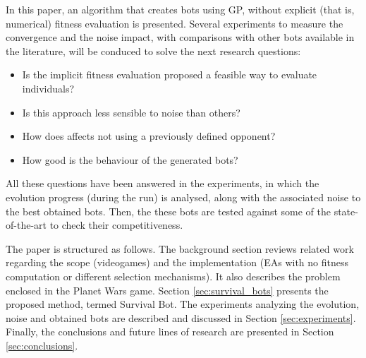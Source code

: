 \documentclass[conference]{IEEEtran}
\begin{document}


In this paper, an algorithm that creates bots using GP, without explicit (that is, numerical) fitness evaluation is presented. Several experiments to measure the convergence and the noise impact, with comparisons with other bots available in the literature, will be conduced to solve the next research questions:
\begin{itemize}
\item Is the implicit fitness evaluation proposed a feasible way to evaluate individuals?
\item Is this approach less sensible to noise than others?
\item How does affects not using a previously defined opponent?
\item How good is the behaviour of the generated bots?
\end{itemize}

All these questions have been answered in the experiments, in which the evolution progress (during the run) is analysed, along with the associated noise to the best obtained bots. Then, the these bots are tested against some of the state-of-the-art to check their competitiveness.

The paper is structured as follows. The background section reviews related work regarding the scope (videogames) and the implementation (EAs with no fitness computation or different selection mechanisms). It also describes the problem enclosed in the Planet Wars game.
Section \ref{sec:survival_bots} presents the proposed method, termed {Survival Bot}.
The experiments analyzing the evolution, noise and obtained bots are described and discussed in Section \ref{sec:experiments}. Finally, the conclusions and future lines of research are presented in Section \ref{sec:conclusions}.
\end{document}
